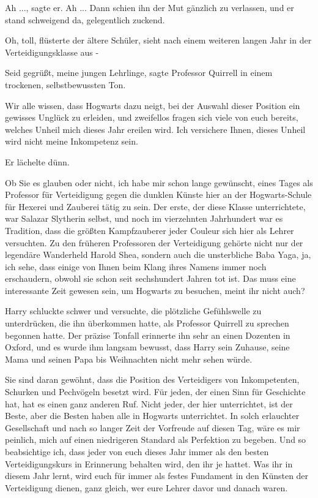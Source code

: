 \glqq{}Ah ...\grqq{}, sagte er. \glqq{}Ah ...\grqq{} Dann schien ihn der Mut
gänzlich zu verlassen, und er stand schweigend da, gelegentlich zuckend.

\glqq{}Oh, toll\grqq{}, flüsterte der ältere Schüler, \glqq{}sieht nach einem
weiteren langen Jahr in der Verteidigungsklasse aus -\grqq{}

\glqq{}Seid gegrüßt, meine jungen Lehrlinge\grqq{}, sagte Professor Quirrell in
einem trockenen, selbstbewussten Ton.

\glqq{}Wir alle wissen, dass Hogwarts dazu neigt, bei der Auswahl dieser
Position ein gewisses Unglück zu erleiden, und zweifellos fragen sich viele von
euch bereits, welches Unheil mich dieses Jahr ereilen wird. Ich versichere
Ihnen, dieses Unheil wird nicht meine Inkompetenz sein.\grqq{}

Er lächelte dünn.

\glqq{}Ob Sie es glauben oder nicht, ich habe mir schon lange gewünscht, eines
Tages als Professor für Verteidigung gegen die dunklen Künste hier an der
Hogwarts-Schule für Hexerei und Zauberei tätig zu sein. Der erste, der diese
Klasse unterrichtete, war Salazar Slytherin selbst, und noch im vierzehnten
Jahrhundert war es Tradition, dass die größten Kampfzauberer jeder Couleur sich
hier als Lehrer versuchten. Zu den früheren Professoren der Verteidigung gehörte
nicht nur der legendäre Wanderheld Harold Shea, sondern auch die unsterbliche
Baba Yaga, ja, ich sehe, dass einige von Ihnen beim Klang ihres Namens immer
noch erschaudern, obwohl sie schon seit sechshundert Jahren tot ist. Das muss
eine interessante Zeit gewesen sein, um Hogwarts zu besuchen, meint ihr nicht
auch?\grqq{}

Harry schluckte schwer und versuchte, die plötzliche Gefühlswelle zu
unterdrücken, die ihn überkommen hatte, als Professor Quirrell zu sprechen
begonnen hatte. Der präzise Tonfall erinnerte ihn sehr an einen Dozenten in
Oxford, und es wurde ihm langsam bewusst, dass Harry sein Zuhause, seine Mama und
seinen Papa bis Weihnachten nicht mehr sehen würde.

\glqq{}Sie sind daran gewöhnt, dass die Position des Verteidigers von
Inkompetenten, Schurken und Pechvögeln besetzt wird. Für jeden, der einen Sinn
für Geschichte hat, hat es einen ganz anderen Ruf. Nicht jeder, der hier
unterrichtet, ist der Beste, aber die Besten haben alle in Hogwarts
unterrichtet. In solch erlauchter Gesellschaft und nach so langer Zeit der
Vorfreude auf diesen Tag, wäre es mir peinlich, mich auf einen niedrigeren
Standard als Perfektion zu begeben. Und so beabsichtige ich, dass jeder von euch
dieses Jahr immer als den besten Verteidigungskurs in Erinnerung behalten wird,
den ihr je hattet. Was ihr in diesem Jahr lernt, wird euch für immer als festes
Fundament in den Künsten der Verteidigung dienen, ganz gleich, wer eure Lehrer
davor und danach waren.\grqq{}

